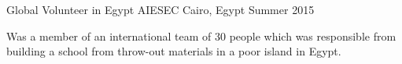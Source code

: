 \begin{cventries}
  \cventry
    {Global Volunteer in Egypt } %
    {AIESEC} %
    {Cairo, Egypt} %
    {Summer 2015} %
    {
      \begin{cvitems} %
        \item {Was a member of an international team of 30 people which was responsible from building a school from throw-out materials in a poor island in Egypt. }
      \end{cvitems}
    }

\end{cventries}
